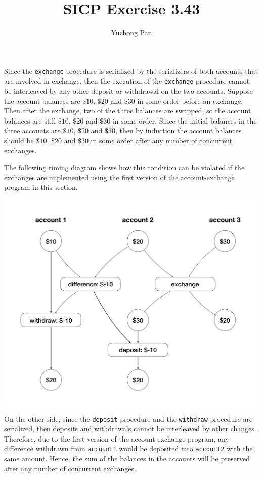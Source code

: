 \documentclass[11pt, oneside]{article}
\title{SICP Exercise 3.43}
\author{Yuchong Pan}
\begin{document}
\maketitle

Since the \texttt{exchange} procedure is serialized by the serializers of both accounts that are involved in exchange, then the execution of the \texttt{exchange} procedure cannot be interleaved by any other deposit or withdrawal on the two accounts. Suppose the account balances are $\$10$, $\$20$ and $\$30$ in some order before an exchange. Then after the exchange, two of the three balances are swapped, so the account balances are still $\$10$, $\$20$ and $\$30$ in some order. Since the initial balances in the three accounts are $\$10$, $\$20$ and $\$30$, then by induction the account balances should be $\$10$, $\$20$ and $\$30$ in some order after any number of concurrent exchanges.

The following timing diagram shows how this condition can be violated if the exchanges are implemented using the first version of the account-exchange program in this section.

\begin{center}
    \includegraphics[width=.7\textwidth,height=.7\textheight,keepaspectratio]{1.png}
\end{center}

On the other side, since the \texttt{deposit} procedure and the \texttt{withdraw} procedure are serialized, then deposits and withdrawals cannot be interleaved by other changes. Therefore, due to the first version of the account-exchange program, any difference withdrawn from \texttt{account1} would be deposited into \texttt{account2} with the same amount. Hence, the sum of the balances in the accounts will be preserved after any number of concurrent exchanges.
\end{document}
